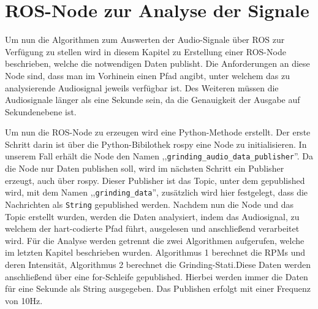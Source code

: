 \chapter{ROS-Node zur Analyse der Signale}
\label{Kapitel7}

Um nun die Algorithmen zum Auswerten der Audio-Signale über ROS zur Verfügung zu stellen wird in diesem Kapitel zu Erstellung einer ROS-Node beschrieben, welche die notwendigen Daten publisht. Die Anforderungen an diese Node sind, dass man im Vorhinein einen Pfad angibt, unter welchem das zu analysierende Audiosignal jeweils verfügbar ist. Des Weiteren müssen die Audiosignale länger als eine Sekunde sein, da die Genauigkeit der Ausgabe auf Sekundenebene ist.

Um nun die ROS-Node zu erzeugen wird eine Python-Methode erstellt. Der erste Schritt darin ist über die Python-Bibilothek rospy eine Node zu initialisieren. In unserem Fall erhält die Node den Namen ,,\texttt{grinding\_audio\_data\_publisher}''. Da die Node nur Daten publishen soll, wird im nächsten Schritt ein Publisher erzeugt, auch über rospy. Dieser Publisher ist das Topic, unter dem gepublished wird, mit dem Namen ,,\texttt{grinding\_data}'', zusätzlich wird hier festgelegt, dass die Nachrichten als \texttt{String} gepublished werden. Nachdem nun die Node und das Topic erstellt wurden, werden die Daten analysiert, indem das Audiosignal, zu welchem der hart-codierte Pfad führt, ausgelesen und anschließend verarbeitet wird. Für die Analyse werden getrennt die zwei Algorithmen aufgerufen, welche im letzten Kapitel beschrieben wurden. Algorithmus 1 berechnet die RPMs und deren Intensität, Algorithmus 2 berechnet die Grinding-Stati.Diese Daten werden anschließend über eine for-Schleife gepublished. Hierbei werden immer die Daten für eine Sekunde als String ausgegeben. Das Publishen erfolgt mit einer Frequenz von 10Hz.


\endinput
